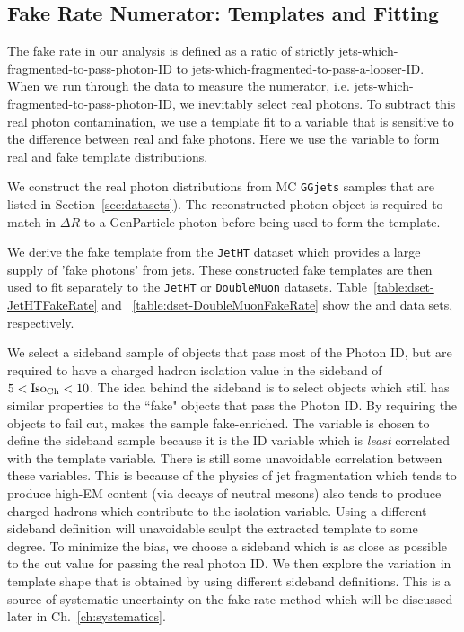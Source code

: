 \subsection{Fake Rate Numerator: Templates and Fitting}

The fake rate in our analysis is defined as a ratio of strictly jets-which-fragmented-to-pass-photon-ID to jets-which-fragmented-to-pass-a-looser-ID. When we run through the data to measure the numerator, i.e. jets-which-fragmented-to-pass-photon-ID, we inevitably select real photons. To subtract this real photon contamination, we use a template fit to a variable that is sensitive to the difference between real and fake photons. Here we use the \sieie variable to form real and fake template distributions. 

We construct the real photon \sieie distributions from MC \texttt{GGjets} samples that are listed in Section~\ref{sec:datasets}). The reconstructed photon object is required to match in $\Delta R$ to a GenParticle photon before being used to form the template.

We derive the fake template from the \texttt{JetHT} dataset which provides a large supply of 'fake photons' from jets. These constructed fake templates are then used to fit separately to the \texttt{JetHT} or \texttt{DoubleMuon} datasets. Table~\ref{table:dset-JetHTFakeRate} and ~\ref{table:dset-DoubleMuonFakeRate} show the \JetHT and \DoubleMuon data sets, respectively.

We select a sideband sample of objects that pass most of the Photon ID, but are required to have a charged hadron isolation value in the sideband of $5<\text{Iso}_{\text{Ch}}<10$\GeV. The idea behind the sideband is to select objects which still has similar properties to the ``fake" objects that pass the Photon ID. By requiring the objects to fail \chiso cut, makes the sample fake-enriched. The \chiso variable is chosen to define the sideband sample because it is the ID variable which is \emph{least} correlated with the \sieie template variable. There is still some unavoidable correlation between these variables. This is because of the physics of jet fragmentation which tends to produce high-EM content (via decays of neutral mesons) also tends to produce charged hadrons which contribute to the isolation variable. Using a different sideband definition will unavoidable sculpt the extracted \sieie template to some degree. To minimize the bias, we choose a sideband which is as close as possible to the cut value for passing the real photon ID. We then explore the variation in template shape that is obtained by using different sideband definitions. This is a source of systematic uncertainty on the fake rate method which will be discussed later in Ch.~\ref{ch:systematics}. 

